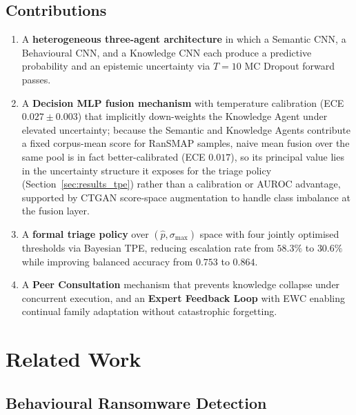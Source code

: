 \documentclass[journal]{IEEEtran}
\begin{document}
\subsection*{Contributions}
\begin{enumerate}
  \item A \textbf{heterogeneous three-agent architecture} in which a Semantic
        CNN, a Behavioural CNN, and a Knowledge CNN each produce a predictive
        probability and an epistemic uncertainty via $T=10$ MC Dropout forward
        passes.
  \item A \textbf{Decision MLP fusion mechanism} with temperature calibration
        (ECE $0.027 \pm 0.003$) that implicitly down-weights the Knowledge
        Agent under elevated uncertainty; because the Semantic and Knowledge
        Agents contribute a fixed corpus-mean score for RanSMAP samples,
        naive mean fusion over the same pool is in fact better-calibrated
        (ECE $0.017$), so its principal value lies in the uncertainty
        structure it exposes for the triage policy
        (Section~\ref{sec:results_tpe}) rather than a calibration or AUROC
        advantage, supported by CTGAN score-space augmentation to handle
        class imbalance at the fusion layer.
  \item A \textbf{formal triage policy} over $(\hat{p}, \sigma_{\max})$ space
        with four jointly optimised thresholds via Bayesian TPE, reducing
        escalation rate from $58.3\%$ to $30.6\%$ while improving balanced accuracy
        from $0.753$ to $0.864$.
  \item A \textbf{Peer Consultation} mechanism that prevents knowledge collapse
        under concurrent execution, and an \textbf{Expert Feedback Loop} with
        EWC enabling continual family adaptation without catastrophic
        forgetting.
\end{enumerate}

\section{Related Work}\label{sec:related}

\subsection{Behavioural Ransomware Detection}
\end{document}
